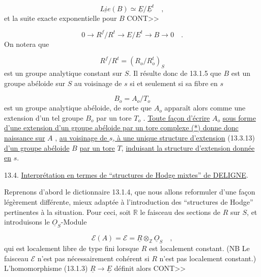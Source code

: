 \begin{equation}\tag{13.3.14}
\underline{Lie}(B) \simeq \underline{E}/\underline{E}^{t} \quad ,
\end{equation}
et la suite exacte exponentielle pour $B$ CONT>>



\begin{equation}\tag{13.3.15}
0 \longrightarrow R^f/R^t \longrightarrow E/E^t \longrightarrow B \longrightarrow 0 \quad .
\end{equation}
On notera que

\begin{equation}\tag{13.3.16}
R^f/R^t = (R_o/R_o^t)_S
\end{equation}
est un groupe analytique constant sur $S$. Il résulte donc de 13.1.5 que $B$ est un groupe abéloide sur $S$ au voisinage de $s$ si et seulement si sa fibre en $s$

\begin{equation*}
B_o = A_o/T_o
\end{equation*}
est un groupe analytique abéloide, de sorte que $A_o$ apparaît alors comme une extension d'un tel groupe $B_o$ par un tore $T_o$ . \underline{Toute façon d'écrire} $A_o$ \underline{sous forme d'une extension d'un groupe abéloide par un tore complexe (*) donne donc naissance sur} $A$ , \underline{au voisinage de $s$, à une unique structure d'extension} (13.3.13) \underline{d'un groupe abéloide} $B$ \underline{par un tore} $T$, \underline{induisant la structure d'extension donnée en} $s$.


13.4. \underline{Interprétation en termes de ``structures de Hodge mixtes'' de DELIGNE}.

Reprenons d'abord le dictionnaire 13.1.4, que nous allons reformuler d'une façon légèrement différente, mieux adaptée à l'introduction des ``structures de Hodge'' pertinentes à la situation. Pour ceci, soit $\mathbb{R}$ le faisceau des sections de $R$ sur $S$, et introduisons le $\underline{O}_S$-Module

\begin{equation}\tag{13.4.1}
\mathcal{E}(A) = \mathcal{E} = \underline{R} \otimes_{\mathbb{Z}} \underline{O}_S \quad ,
\end{equation}
qui est localement libre de type fini lorsque $R$ est localement constant. (NB Le faisceau $\mathcal{E}$ n'est pas nécessairement cohérent si $R$ n'est pas localement constant.) L'homomorphisme (13.1.3) $\underline{R} \longrightarrow \underline{E}$ définit alors CONT>>


